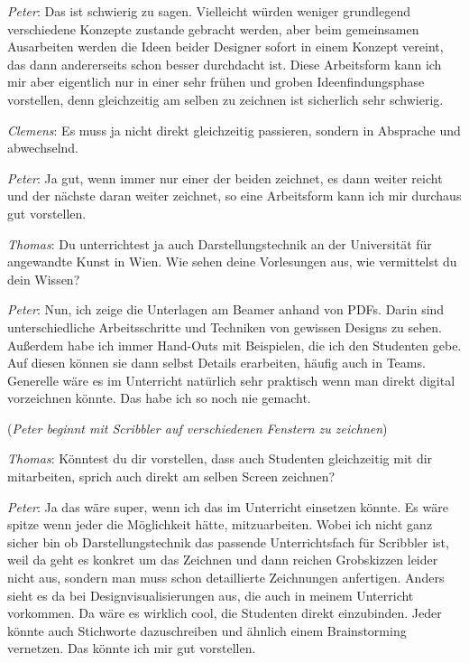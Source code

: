 \medskip \emph{Peter}: Das ist schwierig zu sagen. Vielleicht würden weniger grundlegend verschiedene Konzepte zustande gebracht werden, aber beim gemeinsamen Ausarbeiten werden die Ideen beider Designer sofort in einem Konzept vereint, das dann andererseits schon besser durchdacht ist. Diese Arbeitsform kann ich mir aber eigentlich nur in einer sehr frühen und groben Ideenfindungsphase vorstellen, denn gleichzeitig am selben zu zeichnen ist sicherlich sehr schwierig.

\medskip \emph{Clemens}: Es muss ja nicht direkt gleichzeitig passieren, sondern in Absprache und abwechselnd.

\medskip \emph{Peter}: Ja gut, wenn immer nur einer der beiden zeichnet, es dann weiter reicht und der nächste daran weiter zeichnet, so eine Arbeitsform kann ich mir durchaus gut vorstellen.

\medskip \emph{Thomas}: Du unterrichtest ja auch Darstellungstechnik an der Universität für angewandte Kunst in Wien. Wie sehen deine Vorlesungen aus, wie vermittelst du dein Wissen?

\medskip \emph{Peter}: Nun, ich zeige die Unterlagen am Beamer anhand von PDFs. Darin sind unterschiedliche Arbeitsschritte und Techniken von gewissen Designs zu sehen. Außerdem habe ich immer Hand-Outs mit Beispielen, die ich den Studenten gebe. Auf diesen können sie dann selbst Details erarbeiten, häufig auch in Teams. Generelle wäre es im Unterricht natürlich sehr praktisch wenn man direkt digital vorzeichnen könnte. Das habe ich so noch nie gemacht.

\medskip (\emph{Peter beginnt mit Scribbler auf verschiedenen Fenstern zu zeichnen})

\medskip \emph{Thomas}: Könntest du dir vorstellen, dass auch Studenten gleichzeitig mit dir mitarbeiten, sprich auch direkt am selben Screen zeichnen?

\medskip \emph{Peter}: Ja das wäre super, wenn ich das im Unterricht einsetzen könnte. Es wäre spitze wenn jeder die Möglichkeit hätte, mitzuarbeiten. Wobei ich nicht ganz sicher bin ob Darstellungstechnik das passende Unterrichtsfach für Scribbler ist, weil da geht es konkret um das Zeichnen und dann reichen Grobskizzen leider nicht aus, sondern man muss schon detaillierte Zeichnungen anfertigen. Anders sieht es da bei Designvisualisierungen aus, die auch in meinem Unterricht vorkommen. Da wäre es wirklich cool, die Studenten direkt einzubinden. Jeder könnte auch Stichworte dazuschreiben und ähnlich einem Brainstorming vernetzen. Das könnte ich mir gut vorstellen. 

